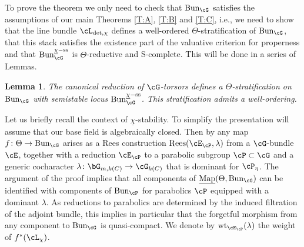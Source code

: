 \documentclass[a4paper]{amsart}
\numberwithin{equation}{section}
\theoremstyle{plain}
\newtheorem{lem}[thm]{Lemma}
\theoremstyle{definition}
\DeclareMathOperator{\Bun}{Bun}
\newcommand{\uMap}{\underline{{\rm Map}}}
\newcommand{\co}{\colon}
\renewcommand{\ss}{{\rm ss}}
\DeclareMathOperator{\wt}{wt}
\DeclareMathOperator{\Rees}{Rees}
\begin{document}
To prove the theorem we only need to check that $\Bun_{\cG}$ satisfies the assumptions of our main Theorems \ref{T:A}, \ref{T:B} and \ref{T:C}, i.e., we need to show that the line bundle $\cL_{\det,\chi}$ defines a well-ordered $\Theta$-stratification of $\Bun_{\cG}$, that this stack satisfies the existence part of the valuative criterion for properness and that $\Bun_{\cG}^{\underline{\chi}-\ss}$ is $\Theta$-reductive and  {\textsf{S}}-complete. This will be done in a series of Lemmas.


\begin{lem} \label{L:theta-strat-bun-g}
	The canonical reduction of $\cG$-torsors defines a $\Theta$-stratification on $\Bun_{\cG}$ with semistable locus $\Bun_{\cG}^{\underline{\chi}-\ss}$. This stratification admits a well-ordering.
\end{lem}

Let us briefly recall the context of $\underline{\chi}$-stability. To simplify the presentation will assume that our base field is algebraically closed. Then by \cite[Lem. 3.9]{heinloth-stability} any map $f\co\Theta\to \Bun_{\cG}$ arises as a Rees construction $\Rees(\cE_{\cP},\lambda)$ from a $\cG$-bundle $\cE$, together with a reduction $\cE_{\cP}$ to a parabolic subgroup $\cP\subset \cG$ and a generic cocharacter $\lambda\co \bG_{m,k(C)}\to \cG_{k(C)}$ that is dominant for $\cP_{\eta}$. The argument of the proof implies that all components of  $\uMap(\Theta,\Bun_\cG)$ can be identified with components of $\Bun_{\cP}$ for parabolics $\cP$ equipped with a dominant $\lambda$. As reductions to parabolics are determined by the induced filtration of the adjoint bundle, this implies in particular that the forgetful morphism from any component to $\Bun_\cG$ is quasi-compact. We denote by $\wt_{\cE_{\cP}}(\lambda)$ the weight of $f^*(\cL_{\chi})$.
\end{document}
